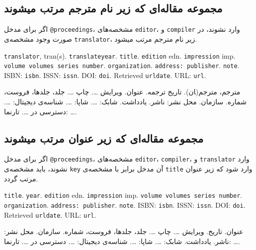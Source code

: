 \documentclass[a4paper,11pt]{article}
\begin{document}
\subsection{مجموعه مقاله‌ای که زیر نام مترجم مرتب میشوند}
اگر برای مدخل \verb|@proceedings|، مشخصه‌های \verb|editor|، و \verb|compiler| وارد نشوند، در صورت وجود مشخصه‌ی \verb|translator|، زیر نام مترجم مرتب میشود.

\begin{itemize}[nosep]
\begin{latin}
\item[] []
{\tt translator}, tran(s). {\tt translateyear}. {\tt title}. {\tt edition} edn. {\tt impression} imp. {\tt volume volumes series number}. {\tt organization}. {\tt address: publisher}. {\tt note}. ISBN: {\tt isbn}. ISSN: {\tt issn}. DOI: {\tt doi}. Retrieved {\tt urldate}. URL: {\tt url}. 
\end{latin}

\item[] []
{\persianttfamily مترجم}، مترجم(‍ان). {\persianttfamily تاریخ ترجمه}. {\persianttfamily عنوان}. ویرایش {\persianttfamily …}. چاپ {\persianttfamily …}. {\persianttfamily جلد، جلدها، فروست، شماره}. {\persianttfamily سازمان}. {\persianttfamily محل نشر: ناشر}. {\persianttfamily یادداشت}. شابک: {\persianttfamily …}. شاپا: {\persianttfamily …}. شناسه‌ی دیجیتال: {\persianttfamily …}. دسترسی در {\persianttfamily …}. تارنما: {\persianttfamily …}. 
\end{itemize}





\subsection{مجموعه مقاله‌ای که زیر عنوان مرتب میشوند}
اگر برای مدخل \verb|@proceedings|، مشخصه‌های \verb|editor|، \verb|compiler|، و \verb|translator| وارد نشوند، باید مشخصه‌ی \verb|key| آن مدخل برابر با مشخصه‌ی \verb|title| وارد شود که زیر عنوان مرتب گردد.

\begin{itemize}[nosep]
\begin{latin}
\item[] []
{\tt title}. {\tt year}. {\tt edition} edn. {\tt impression} imp. {\tt volume volumes series number}. {\tt organization}. {\tt address: publisher}. {\tt note}. ISBN: {\tt isbn}. ISSN: {\tt issn}. DOI: {\tt doi}. Retrieved {\tt urldate}. URL: {\tt url}. 
\end{latin}

\item[] []
{\persianttfamily عنوان}. {\persianttfamily تاریخ}. ویرایش {\persianttfamily …}. چاپ {\persianttfamily …}. {\persianttfamily جلد، جلدها، فروست، شماره}. {\persianttfamily سازمان}. {\persianttfamily محل نشر: ناشر}. {\persianttfamily یادداشت}. شابک: {\persianttfamily …}. شاپا: {\persianttfamily …}. شناسه‌ی دیجیتال: {\persianttfamily …}. دسترسی در {\persianttfamily …}. تارنما: {\persianttfamily …}.
\end{itemize}
\end{document}
